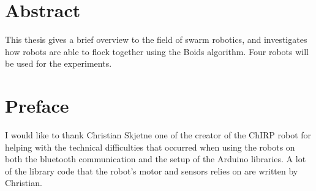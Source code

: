 \section*{Abstract}
\label{sec:abstract}

This thesis gives a brief overview to the field of swarm robotics, and investigates how robots are able to flock together using the Boids algorithm. Four robots will be used for the experiments. %


%
%

\clearpage

\section*{Preface}



\vspace{1cm}


I would like to thank Christian Skjetne one of the creator of the ChIRP robot for helping with the technical difficulties that occurred when using the robots on both the bluetooth communication and the setup of the Arduino libraries. A lot of the library code that the robot's motor and sensors relies on are written by Christian.

